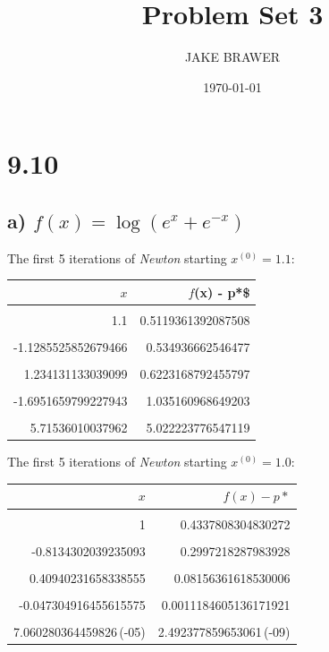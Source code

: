\documentclass[11pt]{article}
\author{JAKE BRAWER}
\date{\today}
\title{Problem Set 3}
\begin{document}
\maketitle

\section{9.10}
\label{sec:orgd81b15b}
\subsection{a) \(f(x) = \log(e^{x}+e^{-x})\)}
\label{sec:orgf9fa732}

The first 5 iterations of \emph{Newton} starting \(x^{(0)} = 1.1\):

\begin{center}
\begin{tabular}{rr}
\(x\) & \(f\)(x) - p*\$\\
\hline
 & \\
1.1 & 0.5119361392087508\\
 & \\
-1.1285525852679466 & 0.534936662546477\\
 & \\
1.234131133039099 & 0.6223168792455797\\
 & \\
-1.6951659799227943 & 1.035160968649203\\
 & \\
5.71536010037962 & 5.022223776547119\\
\end{tabular}
\end{center}


The first 5 iterations of \emph{Newton} starting \(x^{(0)} = 1.0\):

\begin{center}
\begin{tabular}{rr}
\(x\) & \(f(x) - p*\)\\
\hline
 & \\
1 & 0.4337808304830272\\
 & \\
-0.8134302039235093 & 0.2997218287983928\\
 & \\
0.40940231658338555 & 0.08156361618530006\\
 & \\
-0.047304916455615575 & 0.0011184605136171921\\
 & \\
7.060280364459826\,(-05) & 2.492377859653061\,(-09)\\
\end{tabular}
\end{center}
\end{document}
